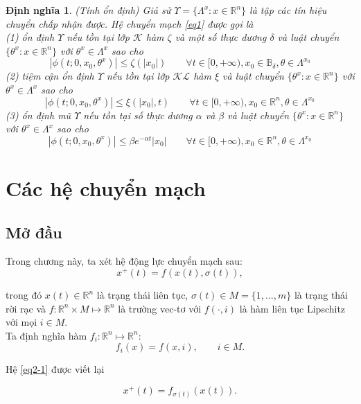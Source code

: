 \documentclass[14pt,a4paper,oneside]{report}		%
\newtheorem{define}[theorem]{Định nghĩa}
\begin{document}
\begin{define} (Tính ổn định) Giả sử $\Upsilon = \{\Lambda^x:x\in\mathbb{R}^n\}$ là tập các tín hiệu chuyển chấp nhận được. Hệ chuyển mạch \ref{eq1} được gọi là \\
(1) ổn định $\Upsilon$ nếu tồn tại lớp $\mathcal{K}$ hàm $\zeta$ và một số thực dương $\delta$ và luật chuyển $\{\theta^x:x\in\mathbb{R}^n\}$ với $\theta^x\in\Lambda^x$ sao cho
$$|\phi(t;0,x_0,\theta^x)|\leq\zeta(|x_0|)\qquad\forall t \in [0,+\infty ), x_0 \in\mathbb{B}_\delta , \theta \in\Lambda^{x_0}$$
(2) tiệm cận ổn định $\Upsilon$ nếu tồn tại lớp $\mathcal{KL}$ hàm $\xi$ và luật chuyển $\{\theta^x:x\in\mathbb{R}^n\}$ với $\theta^x\in\Lambda^x$ sao cho
$$|\phi(t;0,x_0,\theta^x)|\leq\xi(|x_0|,t)\qquad\forall t \in [0,+\infty ), x_0 \in\mathbb{R}^n , \theta \in\Lambda^{x_0}$$
(3) ổn định mũ $\Upsilon$ nếu tồn tại số thực dương $\alpha$ và $\beta$ và luật chuyển $\{\theta^x:x\in\mathbb{R}^n\}$ với $\theta^x\in\Lambda^x$ sao cho
$$|\phi(t;0,x_0,\theta^x)|\leq \beta e^{-\alpha t}|x_0|\qquad\forall t \in [0,+\infty ), x_0 \in\mathbb{R}^n , \theta \in\Lambda^{x_0}$$
\end{define}

\chapter{Các hệ chuyển mạch}
\section{Mở đầu}
Trong chương này, ta xét hệ động lực chuyển mạch sau:
\begin{equation} \label{eq2-1}
x^+(t)=f(x(t),\sigma (t)),
\end{equation}

trong đó $x(t)\in\mathbb{R}^n$ là trạng thái liên tục, $\sigma (t)\in M = \{1,...,m\}$ là trạng thái rời rạc và $f : \mathbb{R}^n \times M \mapsto \mathbb{R}^n$ là trường vec-tơ với $f(\cdot ,i)$ là hàm liên tục Lipschitz với mọi $i\in M$.\\

Ta định nghĩa hàm $f_i : \mathbb{R}^n \mapsto \mathbb{R}^n$:
$$f_i(x)=f(x,i), \qquad i\in M.$$

Hệ \ref{eq2-1} được viết lại

\begin{equation} \label{eq2-2}
x^+(t)=f_{\sigma (t)}(x(t)).
\end{equation}
\end{document}
